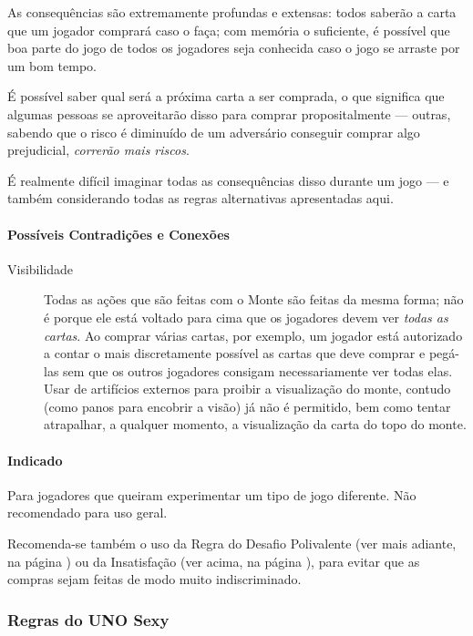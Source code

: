 As consequências são extremamente profundas e extensas: todos saberão a carta que um jogador comprará caso o faça; com memória o suficiente, é possível que boa parte do jogo de todos os jogadores seja conhecida caso o jogo se arraste por um bom tempo.

É possível saber qual será a próxima carta a ser comprada, o que significa que algumas pessoas se aproveitarão disso para comprar propositalmente --- outras, sabendo que o risco é diminuído de um adversário conseguir comprar algo prejudicial, \emph{correrão mais riscos}.

É realmente difícil imaginar todas as consequências disso durante um jogo --- e também considerando todas as regras alternativas apresentadas aqui.

\paragraph{Possíveis Contradições e Conexões}

\begin{description}
\item[Visibilidade]{Todas as ações que são feitas com o Monte são feitas da mesma forma; não é porque ele está voltado para cima que os jogadores devem ver \emph{todas as cartas}. Ao comprar várias cartas, por exemplo, um jogador está autorizado a contar o mais discretamente possível as cartas que deve comprar e pegá-las sem que os outros jogadores consigam necessariamente ver todas elas. Usar de artifícios externos para proibir a visualização do monte, contudo (como panos para encobrir a visão) já não é permitido, bem como tentar atrapalhar, a qualquer momento, a visualização da carta do topo do monte.}
\end{description}

\paragraph{Indicado} 

Para jogadores que queiram experimentar um tipo de jogo diferente. Não recomendado para uso geral.

Recomenda-se também o uso da Regra do Desafio Polivalente (ver mais adiante, na página \pageref{desafiopolivalente}) ou da Insatisfação (ver acima, na página \pageref{insatisfacao}), para evitar que as compras sejam feitas de modo muito indiscriminado.

\subsubsection{Regras do UNO Sexy}


